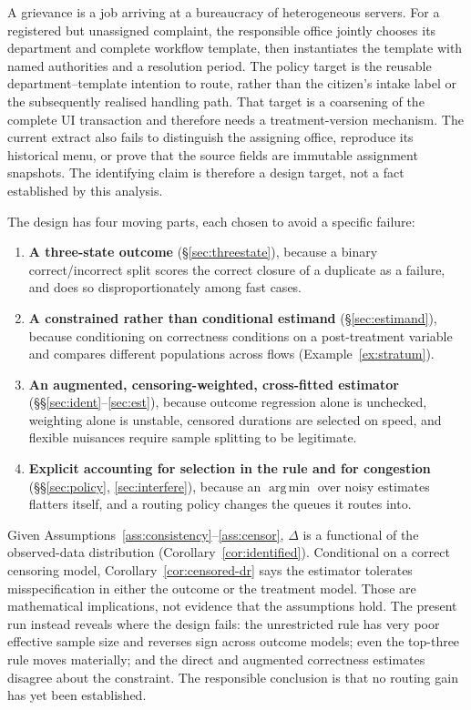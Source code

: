 \documentclass[11pt,a4paper]{article}
\theoremstyle{plain}
\theoremstyle{definition}
\theoremstyle{remark}
\DeclareMathOperator*{\argmin}{arg\,min}
\begin{document}
A grievance is a job arriving at a bureaucracy of heterogeneous servers. For a registered but
unassigned complaint, the responsible office jointly chooses its department and complete
workflow template, then instantiates the template with named authorities and a resolution
period. The policy target is the reusable department--template intention to route, rather than
the citizen's intake label or the subsequently realised handling path. That target is a
coarsening of the complete UI transaction and therefore needs a treatment-version mechanism.
The current extract also fails to distinguish the assigning office, reproduce its historical
menu, or prove that the source fields are immutable assignment snapshots. The identifying claim
is therefore a design target, not a fact established by this analysis.

The design has four moving parts, each chosen to avoid a specific failure:

\begin{enumerate}[leftmargin=*]
\item \textbf{A three-state outcome} (\S\ref{sec:threestate}), because a binary
correct/incorrect split scores the correct closure of a duplicate as a failure, and does so
disproportionately among fast cases.
\item \textbf{A constrained rather than conditional estimand} (\S\ref{sec:estimand}), because
conditioning on correctness conditions on a post-treatment variable and compares different
populations across flows (Example~\ref{ex:stratum}).
\item \textbf{An augmented, censoring-weighted, cross-fitted estimator}
(\S\S\ref{sec:ident}--\ref{sec:est}), because outcome regression alone is unchecked, weighting
alone is unstable, censored durations are selected on speed, and flexible nuisances require
sample splitting to be legitimate.
\item \textbf{Explicit accounting for selection in the rule and for congestion}
(\S\S\ref{sec:policy}, \ref{sec:interfere}), because an $\argmin$ over noisy estimates flatters
itself, and a routing policy changes the queues it routes into.
\end{enumerate}

Given Assumptions~\ref{ass:consistency}--\ref{ass:censor}, $\Delta$ is a functional of the
observed-data distribution (Corollary~\ref{cor:identified}). Conditional on a correct censoring
model, Corollary~\ref{cor:censored-dr} says the estimator tolerates misspecification in either
the outcome or the treatment model. Those are mathematical implications, not evidence that the
assumptions hold. The present run instead reveals where the design fails: the unrestricted rule
has very poor effective sample size and reverses sign across outcome models; even the top-three
rule moves materially; and the direct and augmented correctness estimates disagree about the
constraint. The responsible conclusion is that no routing gain has yet been established.
\end{document}
